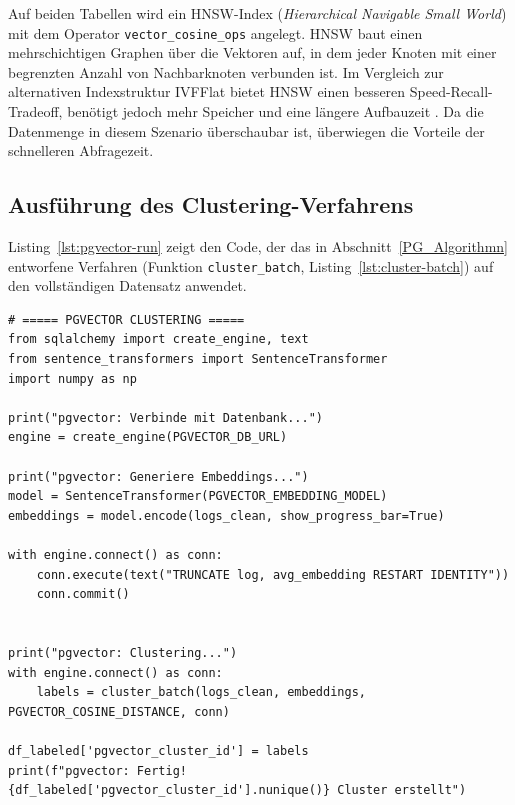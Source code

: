 Auf beiden Tabellen wird ein HNSW-Index (\textit{Hierarchical Navigable Small World})
mit dem Operator \texttt{vector\_cosine\_ops} angelegt. HNSW baut einen
mehrschichtigen Graphen über die Vektoren auf, in dem jeder Knoten mit einer
begrenzten Anzahl von Nachbarknoten verbunden ist. Im Vergleich zur alternativen
Indexstruktur IVFFlat bietet HNSW einen besseren Speed-Recall-Tradeoff, benötigt
jedoch mehr Speicher und eine längere Aufbauzeit
\cite{githubGitHubPgvectorpgvector}. Da die Datenmenge in diesem Szenario
überschaubar ist, überwiegen die Vorteile der schnelleren Abfragezeit.

\subsection{Ausführung des Clustering-Verfahrens}

Listing~\ref{lst:pgvector-run} zeigt den Code, der das in
Abschnitt~\ref{PG_Algorithmn} entworfene Verfahren (Funktion
\texttt{cluster\_batch}, Listing~\ref{lst:cluster-batch}) auf den
vollständigen Datensatz anwendet.

\begin{lstlisting}[caption={Anwendung der Funktion \texttt{cluster\_batch} auf den Gesamtdatensatz},
                   label={lst:pgvector-run}]
# ===== PGVECTOR CLUSTERING =====
from sqlalchemy import create_engine, text
from sentence_transformers import SentenceTransformer
import numpy as np

print("pgvector: Verbinde mit Datenbank...")
engine = create_engine(PGVECTOR_DB_URL)

print("pgvector: Generiere Embeddings...")
model = SentenceTransformer(PGVECTOR_EMBEDDING_MODEL)
embeddings = model.encode(logs_clean, show_progress_bar=True)

with engine.connect() as conn:
    conn.execute(text("TRUNCATE log, avg_embedding RESTART IDENTITY"))
    conn.commit()


print("pgvector: Clustering...")
with engine.connect() as conn:
    labels = cluster_batch(logs_clean, embeddings, PGVECTOR_COSINE_DISTANCE, conn)

df_labeled['pgvector_cluster_id'] = labels
print(f"pgvector: Fertig! {df_labeled['pgvector_cluster_id'].nunique()} Cluster erstellt")
\end{lstlisting}

